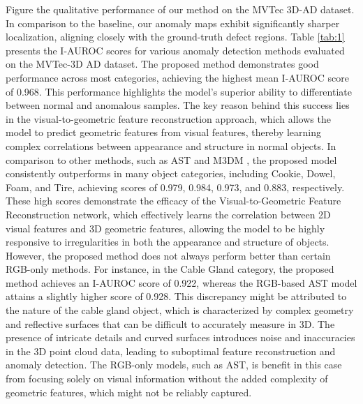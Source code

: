 Figure \DIFdelbegin {}\DIFdelend \DIFaddbegin {}\DIFaddend the qualitative performance of our method on the MVTec 3D-AD dataset. In comparison to the baseline, our anomaly maps exhibit significantly sharper localization, aligning closely with the ground-truth defect regions. Table \ref{tab:1} presents the I-AUROC scores for various anomaly detection methods evaluated on the MVTec-3D AD dataset. The proposed method demonstrates good performance across most categories, achieving the highest mean I-AUROC score of 0.968. This performance highlights the model's superior ability to differentiate between normal and anomalous samples. The key reason behind this success lies in the visual-to-geometric feature reconstruction approach, which allows the model to predict geometric features from visual features, thereby learning complex correlations between appearance and structure in normal objects. In comparison to other methods, such as AST \cite{rudolph2023asymmetric} and M3DM \cite{wang2023multimodal}, the proposed model consistently outperforms in many object categories, including Cookie, Dowel, Foam, and Tire, achieving scores of 0.979, 0.984, 0.973, and 0.883, respectively. These high scores demonstrate the efficacy of the Visual-to-Geometric Feature Reconstruction network, which effectively learns the correlation between 2D visual features and 3D geometric features, allowing the model to be highly responsive to irregularities in both the appearance and structure of objects. However, the proposed method does not always perform better than certain RGB-only methods. For instance, in the Cable Gland category, the proposed method achieves an I-AUROC score of 0.922, whereas the RGB-based AST model attains a slightly higher score of 0.928. This discrepancy might be attributed to the nature of the cable gland object, which is characterized by complex geometry and reflective surfaces that can be difficult to accurately measure in 3D. The presence of intricate details and curved surfaces introduces noise and inaccuracies in the 3D point cloud data, leading to suboptimal feature reconstruction and anomaly detection. The RGB-only models, such as AST, is benefit in this case from focusing solely on visual information without the added complexity of geometric features, which might not be reliably captured.

